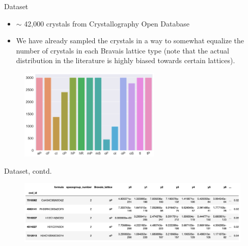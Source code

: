 \documentclass[aspectratio=169]{beamer}
\begin{document}
\begin{frame}{Dataset}
    \begin{itemize}
        \item $\sim$ 42,000 crystals from Crystallography Open Database
        \item We have already sampled the crystals in a way to somewhat equalize the number of crystals in each Bravais lattice type (note that the actual distribution in the literature is highly biased towards certain lattices).  
    \end{itemize}
    \begin{figure}
        \centering
        \includegraphics[width=0.6\textwidth]{figures/lab3_data_distribution.png}
    \end{figure}
\end{frame}


\begin{frame}{Dataset, contd.}
\begin{figure}
    \centering
    \includegraphics[width=\textwidth]{figures/cod_csv_fmt.png}
\end{figure}
\end{frame}
\end{document}
